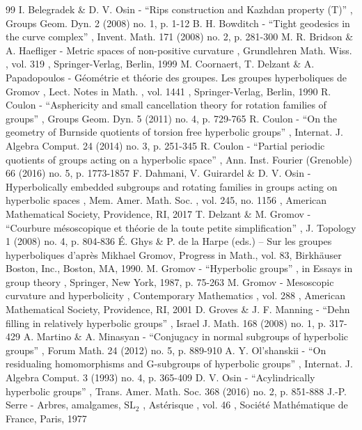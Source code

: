 \documentclass[11pt]{article}
\theoremstyle{definition}
\theoremstyle{remark}
\begin{document}
\begin{thebibliography}{99}
 I. Belegradek \& D. V. Osin - “Rips construction and Kazhdan property (T)” , Groups Geom. Dyn. 2 (2008) no. 1, p. 1-12
 B. H. Bowditch - “Tight geodesics in the curve complex” , Invent. Math. 171 (2008) no. 2, p. 281-300
 M. R. Bridson \& A. Haefliger - Metric spaces of non-positive curvature , Grundlehren Math. Wiss. , vol. 319 , Springer-Verlag, Berlin, 1999
 M. Coornaert, T. Delzant \& A. Papadopoulos - Géométrie et théorie des groupes. Les groupes hyperboliques de Gromov , Lect. Notes in Math. , vol. 1441 , Springer-Verlag, Berlin, 1990
 R. Coulon - “Asphericity and small cancellation theory for rotation families of groups” , Groups Geom. Dyn. 5 (2011) no. 4, p. 729-765
 R. Coulon - “On the geometry of Burnside quotients of torsion free hyperbolic groups” , Internat. J. Algebra Comput. 24 (2014) no. 3, p. 251-345
 R. Coulon - “Partial periodic quotients of groups acting on a hyperbolic space” , Ann. Inst. Fourier (Grenoble) 66 (2016) no. 5, p. 1773-1857
 F. Dahmani, V. Guirardel \& D. V. Osin - Hyperbolically embedded subgroups and rotating families in groups acting on hyperbolic spaces , Mem. Amer. Math. Soc. , vol. 245, no. 1156 , American Mathematical Society, Providence, RI, 2017
 T. Delzant \& M. Gromov - “Courbure mésoscopique et théorie de la toute petite simplification” , J. Topology 1 (2008) no. 4, p. 804-836
 É. Ghys \& P. de la Harpe (eds.) -- Sur les groupes hyperboliques d’après Mikhael Gromov, Progress in Math., vol. 83, Birkhäuser Boston, Inc., Boston, MA, 1990.
 M. Gromov - “Hyperbolic groups” , in Essays in group theory , Springer, New York, 1987, p. 75-263
 M. Gromov - Mesoscopic curvature and hyperbolicity , Contemporary Mathematics , vol. 288 , American Mathematical Society, Providence, RI, 2001
 D. Groves \& J. F. Manning - “Dehn filling in relatively hyperbolic groups” , Israel J. Math. 168 (2008) no. 1, p. 317-429
 A. Martino \& A. Minasyan - “Conjugacy in normal subgroups of hyperbolic groups” , Forum Math. 24 (2012) no. 5, p. 889-910
 A. Y. Ol’shanskii - “On residualing homomorphisms and G-subgroups of hyperbolic groups” , Internat. J. Algebra Comput. 3 (1993) no. 4, p. 365-409
 D. V. Osin - “Acylindrically hyperbolic groups” , Trans. Amer. Math. Soc. 368 (2016) no. 2, p. 851-888
 J.-P. Serre - Arbres, amalgames, $\mathrm{SL}_2$ , Astérisque , vol. 46 , Société Mathématique de France, Paris, 1977
\end{thebibliography}
\end{document}
